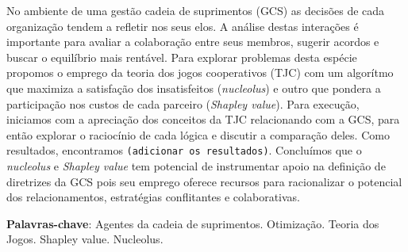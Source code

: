\documentclass[
	article,			        %
	11pt,				          %
	oneside,			        %
	a4paper,			        %
	english,			        %
	brazil,				        %
	sumario=tradicional
]{abntex2}\usepackage[]{graphicx}\usepackage[]{color}
\author{João B. G. Brito, \emph{Esp.}   \\   
    \href{mailto:jbgb@uol.com.br}{jbgb@uol.com.br} 
  \and {Michel J. Anzanello, \emph{Phd}} \\
    \href{mailto:michel.anzanello@gmail.com}{michel.anzanello@gmail.com}
}
\date{\today}
\begin{document}

\frenchspacing 


%
%
\maketitle

\begin{resumoumacoluna}
No ambiente de uma gestão cadeia de suprimentos (GCS) as decisões de cada organização tendem a refletir nos seus elos. A análise destas interações é importante para avaliar a colaboração entre seus membros, sugerir acordos e buscar o equilíbrio mais rentável. Para explorar problemas desta espécie propomos o emprego da teoria dos jogos cooperativos (TJC) com um algorítmo que maximiza a satisfação dos insatisfeitos (\emph{nucleolus}) e outro que pondera a participação nos custos de cada parceiro (\emph{Shapley value}). Para execução, iniciamos com a apreciação dos conceitos da TJC relacionando com a GCS, para então explorar o raciocínio de cada lógica e discutir a comparação deles. Como resultados, encontramos \texttt{(adicionar os resultados)}. Concluímos que o \emph{nucleolus} e \emph{Shapley value} tem potencial de instrumentar apoio na definição de diretrizes da GCS pois seu emprego oferece recursos para racionalizar o potencial dos relacionamentos, estratégias conflitantes e colaborativas.

 \vspace{\onelineskip}
 
 \noindent
 \textbf{Palavras-chave}: Agentes da cadeia de suprimentos. Otimiza\c{c}{\~a}o. Teoria dos Jogos. Shapley value. Nucleolus.
\end{resumoumacoluna}


\textual
\end{document}
